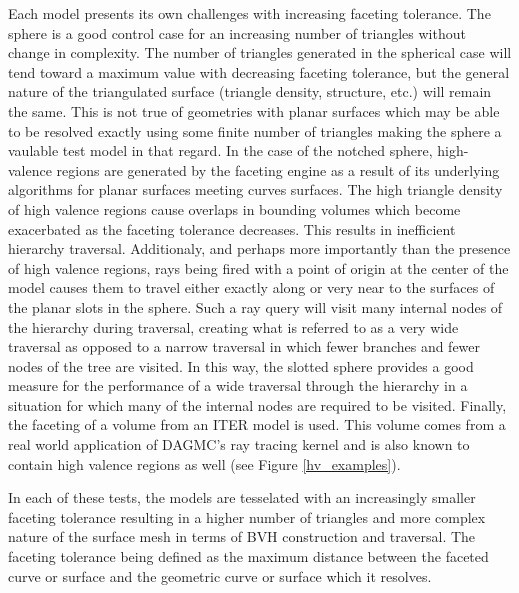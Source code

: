\documentclass[12pt, a4paper]{article}
\begin{document}
Each model presents its own challenges with increasing faceting tolerance. The sphere is a good control case for an increasing number of triangles without change in complexity. The number of triangles generated in the spherical case will tend toward a maximum value with decreasing faceting tolerance, but the general nature of the triangulated surface (triangle density, structure, etc.) will remain the same. This is not true of geometries with planar surfaces which may be able to be resolved exactly using some finite number of triangles making the sphere a vaulable test model in that regard. In the case of the notched sphere, high-valence regions are generated by the faceting engine as a result of its underlying algorithms for planar surfaces meeting curves surfaces. The high triangle density of high valence regions cause overlaps in bounding volumes which become exacerbated as the faceting tolerance decreases. This results in inefficient hierarchy traversal. Additionaly, and perhaps more importantly than the presence of high valence regions, rays being fired with a point of origin at the center of the model causes them to travel either exactly along or very near to the surfaces of the planar slots in the sphere. Such a ray query will visit many internal nodes of the hierarchy during traversal, creating what is referred to as a very wide traversal as opposed to a narrow traversal in which fewer branches and fewer nodes of the tree are visited. In this way, the slotted sphere provides a good measure for the performance of a wide traversal through the hierarchy in a situation for which many of the internal nodes are required to be visited. Finally, the faceting of a volume from an ITER model is used. This volume comes from a real world application of DAGMC's ray tracing kernel and is also known to contain high valence regions as well (see Figure \ref{hv_examples}).

In each of these tests, the models are tesselated with an increasingly smaller faceting tolerance resulting in a higher number of triangles and more complex nature of the surface mesh in terms of BVH construction and traversal. The faceting tolerance being defined as the maximum distance between the faceted curve or surface and the geometric curve or surface which it resolves. 
\end{document}
